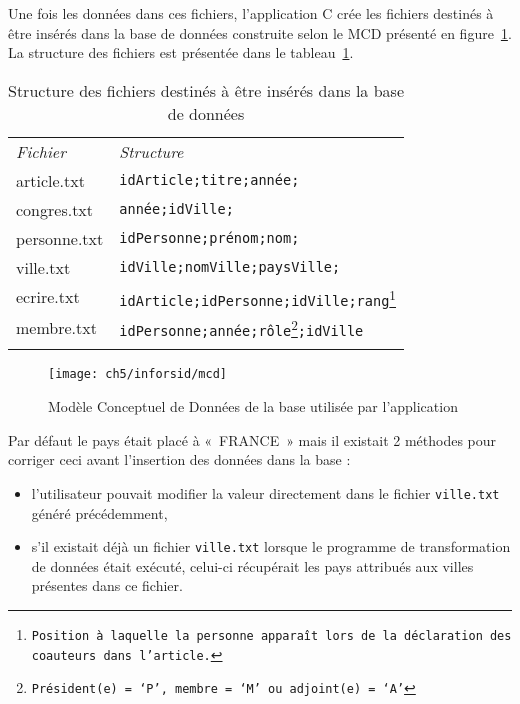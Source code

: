 				Une fois les données dans ces fichiers, l'application C crée les fichiers destinés à être insérés dans la base de données construite selon le MCD présenté en figure~\ref{fig:mcd}. La structure des fichiers est présentée dans le tableau~\ref{tab:struct}.
				
				\begin{savenotes}%
				\begin{table}[h]
					\centering
					\caption{Structure des fichiers destinés à être insérés dans la base de données}\label{tab:struct}
					\begin{tabular}{ll}
						&\\
						\toprule
						\textit{Fichier} & \textit{Structure}\\
						\midrule
						article.txt		& \texttt{idArticle;titre;année;} \\
						congres.txt	& \texttt{année;idVille;} \\
						personne.txt	& \texttt{idPersonne;prénom;nom;} \\
						ville.txt		& \texttt{idVille;nomVille;paysVille;} \\
						ecrire.txt		& \texttt{idArticle;idPersonne;idVille;rang\footnote{Position à laquelle la personne apparaît lors de la déclaration des coauteurs dans l'article.}} \\
						membre.txt	& \texttt{idPersonne;année;rôle\footnote{Président(e) = \lq{}P', membre = \lq{}M' ou adjoint(e) = \lq{}A'};idVille} \\
						\bottomrule
						&\\
					\end{tabular}
				\end{table}
				\end{savenotes}
				
				\begin{figure}[h]
					\center
					\texttt{[image: ch5/inforsid/mcd]}
					\caption{Modèle Conceptuel de Données de la base utilisée par l'application \citep{ternisien}}\label{fig:mcd}
				\end{figure}
	
				Par défaut le pays était placé à «~FRANCE~» mais il existait 2 méthodes pour corriger ceci avant l'insertion des données dans la base :
				\begin{itemize}
					\item l'utilisateur pouvait modifier la valeur directement dans le fichier \texttt{ville.txt} généré précédemment,
					\item s'il existait déjà un fichier \texttt{ville.txt} lorsque le programme de transformation de données était exécuté, celui-ci récupérait les pays attribués aux villes présentes dans ce fichier.
				\end{itemize}
	
